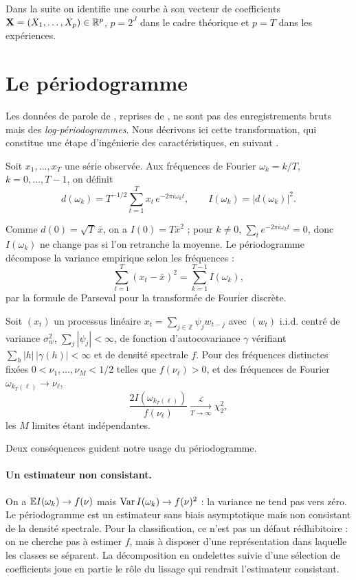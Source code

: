 Dans la suite on identifie une courbe à son vecteur de coefficients $\mathbf{X}=(X_1,\dots,X_p)\in\mathbb{R}^p$, $p=2^J$ dans le cadre théorique et $p=T$ dans les expériences.

\section{Le périodogramme}\label{sec-periodogramme}

Les données de parole de \citet{berlinet2008functional}, reprises de \citet{hastie1995penalized}, ne sont pas des enregistrements bruts mais des \emph{log-périodogrammes}. Nous décrivons ici cette transformation, qui constitue une étape d'ingénierie des caractéristiques, en suivant \citet[section 4.3]{shumway2011time}.

\begin{definition}
Soit $x_1,\dots,x_T$ une série observée. Aux fréquences de Fourier $\omega_k=k/T$, $k=0,\dots,T-1$, on définit
\[
  d(\omega_k)=T^{-1/2}\sum_{t=1}^{T}x_t\,e^{-2\pi i\omega_kt},
  \qquad
  I(\omega_k)=|d(\omega_k)|^2 .
\]
\end{definition}

Comme $d(0)=\sqrt T\,\bar x$, on a $I(0)=T\bar x^2$ ; pour $k\ne0$, $\sum_te^{-2\pi i\omega_kt}=0$, donc $I(\omega_k)$ ne change pas si l'on retranche la moyenne. Le périodogramme décompose la variance empirique selon les fréquences :
\[
  \sum_{t=1}^T(x_t-\bar x)^2=\sum_{k=1}^{T-1}I(\omega_k),
\]
par la formule de Parseval pour la transformée de Fourier discrète.

\begin{proposition}\label{prop-periodogramme}
Soit $(x_t)$ un processus linéaire $x_t=\sum_{j\in\mathbb Z}\psi_jw_{t-j}$ avec $(w_t)$ i.i.d. centré de variance $\sigma_w^2$, $\sum_j|\psi_j|<\infty$, de fonction d'autocovariance $\gamma$ vérifiant $\sum_h|h|\,|\gamma(h)|<\infty$ et de densité spectrale $f$. Pour des fréquences distinctes fixées $0<\nu_1,\dots,\nu_M<1/2$ telles que $f(\nu_\ell)>0$, et des fréquences de Fourier $\omega_{k_T(\ell)}\to\nu_\ell$,
\[
  \frac{2I(\omega_{k_T(\ell)})}{f(\nu_\ell)}\xrightarrow[T\to\infty]{\mathcal L}\chi^2_2,
\]
les $M$ limites étant indépendantes.
\end{proposition}

Deux conséquences guident notre usage du périodogramme.

\paragraph{Un estimateur non consistant.} On a $\mathbb{E} I(\omega_k)\to f(\nu)$ mais $\operatorname{Var} I(\omega_k)\to f(\nu)^2$ : la variance ne tend pas vers zéro. Le périodogramme est un estimateur sans biais asymptotique mais non consistant de la densité spectrale. Pour la classification, ce n'est pas un défaut rédhibitoire : on ne cherche pas à estimer $f$, mais à disposer d'une représentation dans laquelle les classes se séparent. La décomposition en ondelettes suivie d'une sélection de coefficients joue en partie le rôle du lissage qui rendrait l'estimateur consistant.

